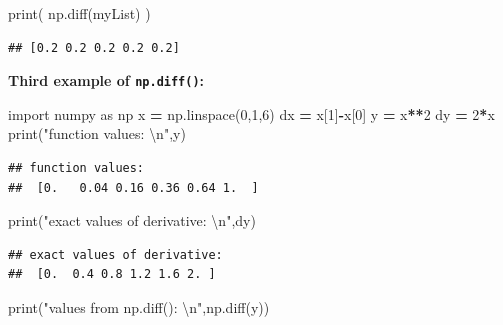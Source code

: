 \documentclass[
]{book}
\newenvironment{Shaded}{\begin{snugshade}}{\end{snugshade}}
\newcommand{\BuiltInTok}[1]{#1}
\newcommand{\CharTok}[1]{\textcolor[rgb]{0.31,0.60,0.02}{#1}}
\newcommand{\DecValTok}[1]{\textcolor[rgb]{0.00,0.00,0.81}{#1}}
\newcommand{\ImportTok}[1]{#1}
\newcommand{\NormalTok}[1]{#1}
\newcommand{\OperatorTok}[1]{\textcolor[rgb]{0.81,0.36,0.00}{\textbf{#1}}}
\newcommand{\StringTok}[1]{\textcolor[rgb]{0.31,0.60,0.02}{#1}}
\theoremstyle{definition}
\theoremstyle{definition}
\theoremstyle{definition}
\theoremstyle{remark}
\begin{document}
\begin{Shaded}
\begin{Highlighting}[]
\BuiltInTok{print}\NormalTok{( np.diff(myList) )}
\end{Highlighting}
\end{Shaded}

\begin{verbatim}
## [0.2 0.2 0.2 0.2 0.2]
\end{verbatim}

\textbf{Third example of \texttt{np.diff()}:}

\begin{Shaded}
\begin{Highlighting}[]
\ImportTok{import}\NormalTok{ numpy }\ImportTok{as}\NormalTok{ np}
\NormalTok{x }\OperatorTok{=}\NormalTok{ np.linspace(}\DecValTok{0}\NormalTok{,}\DecValTok{1}\NormalTok{,}\DecValTok{6}\NormalTok{)}
\NormalTok{dx }\OperatorTok{=}\NormalTok{ x[}\DecValTok{1}\NormalTok{]}\OperatorTok{{-}}\NormalTok{x[}\DecValTok{0}\NormalTok{]}
\NormalTok{y }\OperatorTok{=}\NormalTok{ x}\OperatorTok{**}\DecValTok{2}
\NormalTok{dy }\OperatorTok{=} \DecValTok{2}\OperatorTok{*}\NormalTok{x}
\BuiltInTok{print}\NormalTok{(}\StringTok{"function values: }\CharTok{\textbackslash{}n}\StringTok{"}\NormalTok{,y)}
\end{Highlighting}
\end{Shaded}

\begin{verbatim}
## function values: 
##  [0.   0.04 0.16 0.36 0.64 1.  ]
\end{verbatim}

\begin{Shaded}
\begin{Highlighting}[]
\BuiltInTok{print}\NormalTok{(}\StringTok{"exact values of derivative: }\CharTok{\textbackslash{}n}\StringTok{"}\NormalTok{,dy)}
\end{Highlighting}
\end{Shaded}

\begin{verbatim}
## exact values of derivative: 
##  [0.  0.4 0.8 1.2 1.6 2. ]
\end{verbatim}

\begin{Shaded}
\begin{Highlighting}[]
\BuiltInTok{print}\NormalTok{(}\StringTok{"values from np.diff(): }\CharTok{\textbackslash{}n}\StringTok{"}\NormalTok{,np.diff(y))}
\end{Highlighting}
\end{Shaded}
\end{document}
